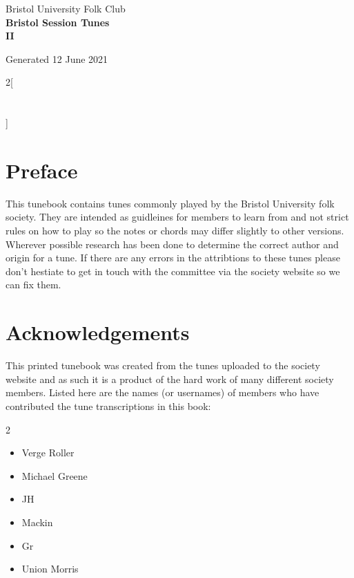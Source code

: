 \documentclass[12pt,a4paper,twoside]{article}
\makeatletter
\newcommand{\thetitle}{Bristol Session Tunes \\ \vspace{0.65cm} II}
\newcommand{\thedate}{12 June 2021}
\renewcommand\tableofcontents{%
    \begin{multicols}{2}[
      \centering
      \section*{\large\contentsname
        \@mkboth{%
           \MakeUppercase\contentsname}{\MakeUppercase\contentsname}}]
    \@starttoc{toc}%
    \end{multicols}
}
\makeatother
\begin{document}
\begin{titlepage}
   \begin{center}
       \large Bristol University Folk Club \\

       \vspace{4cm}
       \textbf{\Huge \thetitle}

       \vspace{0.5cm}
       Generated \thedate

       \vspace{1.5cm}

       \vfill

   \end{center}
\end{titlepage}

\tableofcontents

\section{Preface}

This tunebook contains tunes commonly played by the Bristol University folk society. They are intended as guidleines for members to learn from and not strict rules on how to play so the notes or chords may differ slightly to other versions.
Wherever possible research has been done to determine the correct author and origin for a tune. If there are any errors in the attribtions to these tunes please don't hestiate to get in touch with the committee via the society website so we can fix them.

\section{Acknowledgements}

This printed tunebook was created from the tunes uploaded to the society website and as such it is a product of the hard work of many different society members. Listed here are the names (or usernames) of members who have contributed the tune transcriptions in this book:

\begin{multicols}{2}
\begin{itemize}\item Verge Roller
\item Michael Greene
\item JH
\item Mackin
\item Gr
\item Union Morris
\end{itemize}

\end{multicols}
\end{document}
